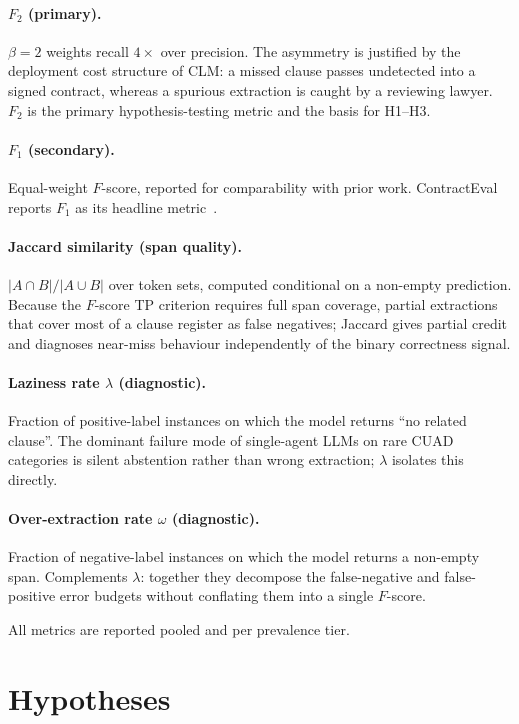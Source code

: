 \paragraph{$F_2$ (primary).}
$\beta{=}2$ weights recall $4\times$ over precision. The asymmetry is justified by the
deployment cost structure of CLM: a missed clause passes undetected into a signed
contract, whereas a spurious extraction is caught by a reviewing lawyer. $F_2$ is the
primary hypothesis-testing metric and the basis for H1--H3.

\paragraph{$F_1$ (secondary).}
Equal-weight $F$-score, reported for comparability with prior work.
ContractEval reports $F_1$ as its headline metric~\cite{liu2025contracteval}.

\paragraph{Jaccard similarity (span quality).}
$|A \cap B| / |A \cup B|$ over token sets, computed conditional on a non-empty
prediction. Because the $F$-score TP criterion requires full span coverage,
partial extractions that cover most of a clause register as false negatives; Jaccard
gives partial credit and diagnoses near-miss behaviour independently of the
binary correctness signal.

\paragraph{Laziness rate $\lambda$ (diagnostic).}
Fraction of positive-label instances on which the model returns ``no related
clause''. The dominant failure mode of single-agent LLMs on rare CUAD categories
is silent abstention rather than wrong extraction; $\lambda$ isolates this directly.

\paragraph{Over-extraction rate $\omega$ (diagnostic).}
Fraction of negative-label instances on which the model returns a non-empty span.
Complements $\lambda$: together they decompose the false-negative and false-positive
error budgets without conflating them into a single $F$-score.

All metrics are reported pooled and per prevalence tier.

\section{Hypotheses}\label{sec:meth:hypotheses}


